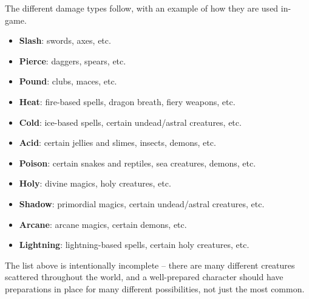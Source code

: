 \documentclass{article}
\begin{document}
The different damage types follow, with an example of how they are used
in-game.

\begin{itemize}
\item {\bf Slash}: swords, axes, etc.
\item {\bf Pierce}: daggers, spears, etc.
\item {\bf Pound}: clubs, maces, etc.
\item {\bf Heat}: fire-based spells, dragon breath, fiery weapons, etc.
\item {\bf Cold}: ice-based spells, certain undead/astral creatures, etc.
\item {\bf Acid}: certain jellies and slimes, insects, demons, etc.
\item {\bf Poison}: certain snakes and reptiles, sea creatures, demons, etc.
\item {\bf Holy}: divine magics, holy creatures, etc.
\item {\bf Shadow}: primordial magics, certain undead/astral creatures, etc.
\item {\bf Arcane}: arcane magics, certain demons, etc.
\item {\bf Lightning}: lightning-based spells, certain holy creatures, etc.
\end{itemize}

The list above is intentionally incomplete -- there are many different
creatures scattered throughout the world, and a well-prepared character 
should have preparations in place for many different possibilities, not 
just the most common.
\end{document}
